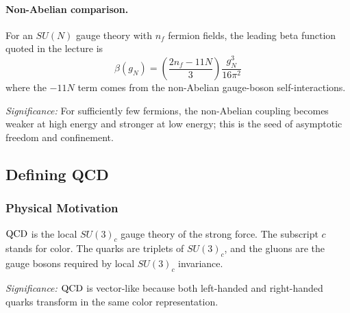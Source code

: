 \documentclass[../main.tex]{subfiles}
\begin{document}
\paragraph{Non-Abelian comparison.}
For an $SU(N)$ gauge theory with $n_f$ fermion fields, the leading beta function quoted in the lecture is
\begin{equation}
  \boxed{\;\beta(g_N)=\left(\frac{2n_f-11N}{3}\right)\frac{g_N^3}{16\pi^2}\;}
  \label{eq:lec14:sun_beta}
\end{equation}
where the $-11N$ term comes from the non-Abelian gauge-boson self-interactions.

\textit{Significance:} For sufficiently few fermions, the non-Abelian coupling becomes weaker at high energy and stronger at low energy; this is the seed of asymptotic freedom and confinement.


\subsection{Defining QCD}\label{sec:lec14:defining-qcd}

\subsubsection*{Physical Motivation}

$\mathrm{QCD}$ is the local $SU(3)_c$ gauge theory of the strong force. The subscript $c$ stands for color. The quarks are triplets of $SU(3)_c$, and the gluons are the gauge bosons required by local $SU(3)_c$ invariance.


\textit{Significance:} $\mathrm{QCD}$ is vector-like because both left-handed and right-handed quarks transform in the same color representation.
\end{document}
